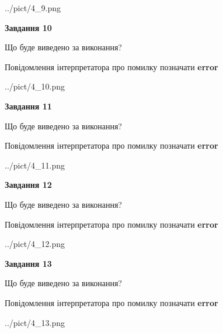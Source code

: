 \documentclass[11pt, ukrainian]{article}
\begin{document}
{\begin {large}
\begin{center}
	{../pict/4_9.png}
\end{center}
\newpage

{\begin {center}\textbf{Завдання 10}\end {center}}\par
Що буде виведено за виконання? \par
Повідомлення інтерпретатора про помилку позначати \textbf{error}

\begin{center}
	{../pict/4_10.png}
\end{center}
\newpage

{\begin {center}\textbf{Завдання 11}\end {center}}\par
Що буде виведено за виконання? \par
Повідомлення інтерпретатора про помилку позначати \textbf{error}

\begin{center}
	{../pict/4_11.png}
\end{center}
\newpage

{\begin {center}\textbf{Завдання 12}\end {center}}\par
Що буде виведено за виконання? \par
Повідомлення інтерпретатора про помилку позначати \textbf{error}

\begin{center}
	{../pict/4_12.png}
\end{center}
\newpage

{\begin {center}\textbf{Завдання 13}\end {center}}\par
Що буде виведено за виконання? \par
Повідомлення інтерпретатора про помилку позначати \textbf{error}

\begin{center}
	{../pict/4_13.png}
\end{center}
\newpage


\end{large}}
\end{document}
